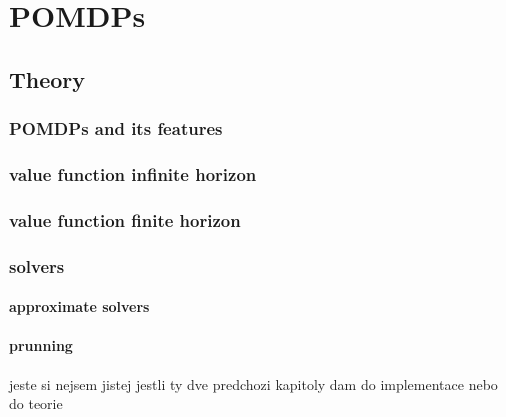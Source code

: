 
\part{POMDPs}

\chapter{Theory}

\section{POMDPs and its features}

\section{value function infinite horizon}

\section{value function finite horizon}

\section{solvers}

\subsection{approximate solvers}

\subsection{prunning}
jeste si nejsem jistej jestli ty dve predchozi kapitoly dam do implementace nebo do teorie